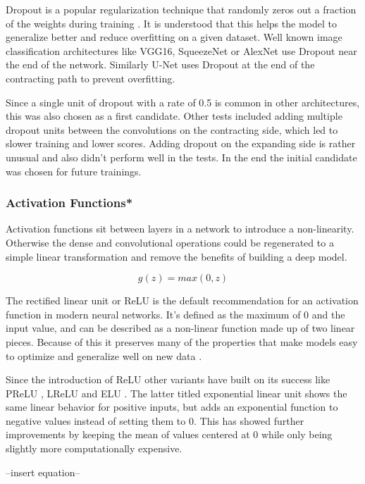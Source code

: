 Dropout is a popular regularization technique that randomly zeros out a fraction of the weights during training \cite{Srivastava2014}. It is understood that this helps the model to generalize better and reduce overfitting on a given dataset. Well known image classification architectures like VGG16, SqueezeNet or AlexNet use Dropout near the end of the network. Similarly U-Net uses Dropout at the end of the contracting path to prevent overfitting.

Since a single unit of dropout with a rate of 0.5 is common in other architectures, this was also chosen as a first candidate. Other tests included adding multiple dropout units between the convolutions on the contracting side, which led to slower training and lower scores. Adding dropout on the expanding side is rather unusual and also didn't perform well in the tests. In the end the initial candidate was chosen for future trainings.

\subsubsection{Activation Functions*}

Activation functions sit between layers in a network to introduce a non-linearity. Otherwise the dense and convolutional operations could be regenerated to a simple linear transformation and remove the benefits of building a deep model.

\begin{equation}
g(z) = max(0,z)
\end{equation}

The rectified linear unit or ReLU \cite{Nair} is the default recommendation for an activation function in modern neural networks. It's defined as the maximum of 0 and the input value, and can be described as a non-linear function made up of two linear pieces. Because of this it preserves many of the properties that make models easy to optimize and generalize well on new data \cite{Goodfellow2016}.

Since the introduction of ReLU other variants have built on its success like PReLU \cite{He2015}, LReLU and ELU \cite{Clevert2015}. The latter titled exponential linear unit shows the same linear behavior for positive inputs, but adds an exponential function to negative values instead of setting them to 0. This has showed further improvements by keeping the mean of values centered at 0 while only being slightly more computationally expensive.

--insert equation--

